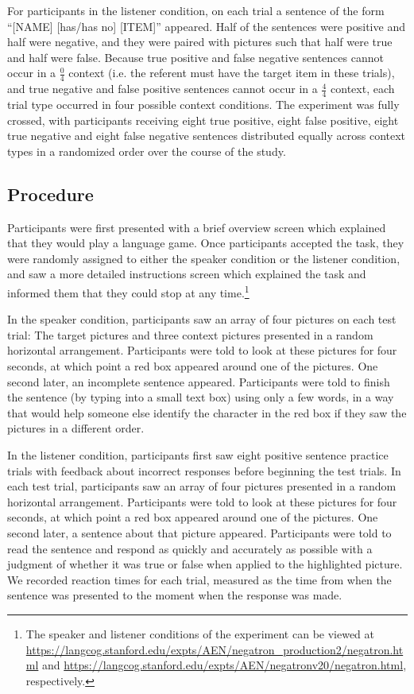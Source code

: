 \documentclass[man, noapacite]{apa2}
\begin{document}
For participants in the listener condition, on each trial a sentence of the form ``[NAME] [has/has no] [ITEM]'' appeared.  Half of the sentences were positive and half were negative, and they were paired with pictures such that half were true and half were false.  Because true positive and false negative sentences cannot occur in a $\frac{0}{4}$ context (i.e. the referent must have the target item in these trials), and true negative and false positive sentences cannot occur in a $\frac{4}{4}$ context, each trial type occurred in four possible context conditions.  The experiment was fully crossed, with participants receiving eight true positive, eight false positive, eight true negative and eight false negative sentences distributed equally across context types in a randomized order over the course of the study.  

\subsection{Procedure}

Participants were first presented with a brief overview screen which explained that they would play a language game.  Once participants accepted the task, they were randomly assigned to either the speaker condition or the listener condition, and saw a more detailed instructions screen which explained the task and informed them that they could stop at any time.\footnote{The speaker and listener conditions of the experiment can be viewed at \url{https://langcog.stanford.edu/expts/AEN/negatron_production2/negatron.html} and \url{https://langcog.stanford.edu/expts/AEN/negatronv20/negatron.html}, respectively.}

In the speaker condition, participants saw an array of four pictures on each test trial: The target pictures and three context pictures presented in a random horizontal arrangement.  Participants were told to look at these pictures for four seconds, at which point a red box appeared around one of the pictures.  One second later, an incomplete sentence appeared.  Participants were told to finish the sentence (by typing into a small text box) using only a few words, in a way that would help someone else identify the character in the red box if they saw the pictures in a different order.

In the listener condition, participants first saw eight positive sentence practice trials with feedback about incorrect responses before beginning the test trials. In each test trial, participants saw an array of four pictures presented in a random horizontal arrangement.  Participants were told to look at these pictures for four seconds, at which point a red box appeared around one of the pictures.  One second later, a sentence about that picture appeared.  Participants were told to read the sentence and respond as quickly and accurately as possible with a judgment of whether it was true or false when applied to the highlighted picture.  We recorded reaction times for each trial, measured as the time from when the sentence was presented to the moment when the response was made.
  
\end{document}
